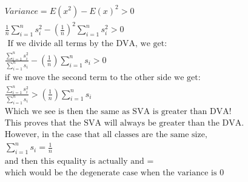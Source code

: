 \documentclass[11pt]{article}
\begin{document}
    \begin{gather*}
    \begin{align*}
    Variance = E(x^2) - E(x)^2 > 0\\
     \frac{1}{n} \sum\limits_{i=1}^n s_i^2 - (\frac{1}{n})^2 \sum\limits_{i=1}^n s_i^2 > 0\\
     \text{ If we divide all terms by the DVA, we get:}\\
     \frac{\sum\limits_{i=1}^n s_i^2}{\sum\limits_{i=1}^n s_i} - (\frac{1}{n}) \sum\limits_{i=1}^n s_i > 0\\
     \text{if we move the second term to the other side we get:}\\
     \frac{\sum\limits_{i=1}^n s_i^2}{\sum\limits_{i=1}^n s_i} > (\frac{1}{n}) \sum\limits_{i=1}^n s_i\\
     \text{Which we see is then the same as SVA is greater than DVA!}\\
     \text{This proves that the SVA will always be greater than the DVA.}\\
     \text{However, in the case that all classes are the same size,}\\
     \sum\limits_{i=1}^n s_i = \frac{1}{n}\\
     \text{and then this equality is actually and =} \\
     \text{which would be the degenerate case when the variance is 0}
    \end{align*}
    \end{gather*}
\end{document}
